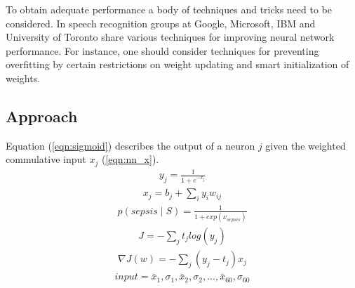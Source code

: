 \documentclass[12pt,solutions]{article}
\begin{document}
To obtain adequate performance a body of techniques and tricks need to be considered. In \cite{hinton2012deep} speech recognition groups at Google, Microsoft, IBM and University of Toronto share various techniques for improving neural network performance. For instance, one should consider techniques for
preventing overfitting by certain restrictions on weight updating and smart initialization of weights.

\subsection{Approach}

Equation (\ref{eqn:sigmoid}) describes
the output of a neuron $j$ given the weighted commulative input $x_j$ (\ref{eqn:nn_x}). 
\begin{align}
y_{j} = \frac{1}{1+e^{-x_{j}}}
\label{eqn:sigmoid}
\end{align}
\begin{align}
x_{j} = b_{j} + \sum_{i}y_{i}w_{ij}
\label{eqn:nn_x}
\end{align}
\begin{align}
p(sepsis \mid S) = \frac{1}{1 + exp(x_{sepsis})}
\label{eqn:nn_prob}
\end{align}
\begin{align}
J = -\sum_{j} t_{j} log(y_{j})
\label{eqn:nn_J}
\end{align}
\begin{align}
\nabla J(w) = -\sum_{j} (y_{j} - t_{j}) x_{j}
\label{eqn:nn_dJ}
\end{align}
\begin{align}
input = \bar{x}_{1}, \sigma_{1}, \bar{x}_{2}, \sigma_{2}, ... ,\bar{x}_{60}, \sigma_{60}
\label{eqn:nn_input}
\end{align}
\end{document}
